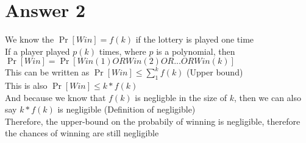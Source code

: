 \documentclass[11pt]{article}
\theoremstyle{definition}
\begin{document}
\begin{enumerate}
\end{enumerate}

\section*{Answer 2}
We know the $\Pr[Win] = f(k)$ if the lottery is played one time\\
If a player played $p(k)$ times, where $p$ is a polynomial, then $\Pr[Win] = \Pr[Win(1) OR Win(2) OR ... OR Win(k)]$\\
This can be written as $\Pr[Win] \le \sum_{1}^{k}f(k)$ (Upper bound)\\
This is also $\Pr[Win] \le k*f(k)$\\
And because we know that $f(k)$ is negligble in the size of $k$, then we can also say $k*f(k)$ is negligible (Definition of negligible)\\
Therefore, the upper-bound on the probabily of winning is negligible, therefore the chances of winning are still negligible\\
\end{document}
